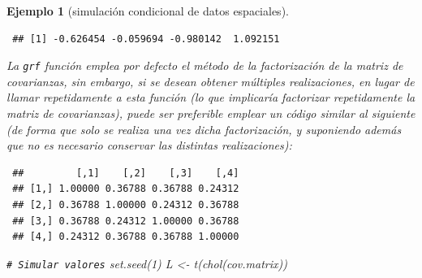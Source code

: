 \documentclass[
  10pt,
]{book}
\newenvironment{Shaded}{\begin{snugshade}}{\end{snugshade}}
\newcommand{\AttributeTok}[1]{\textcolor[rgb]{0.77,0.63,0.00}{#1}}
\newcommand{\CommentTok}[1]{\textcolor[rgb]{0.56,0.35,0.01}{\textit{#1}}}
\newcommand{\DecValTok}[1]{\textcolor[rgb]{0.00,0.00,0.81}{#1}}
\newcommand{\FunctionTok}[1]{\textcolor[rgb]{0.00,0.00,0.00}{#1}}
\newcommand{\NormalTok}[1]{#1}
\newcommand{\OtherTok}[1]{\textcolor[rgb]{0.56,0.35,0.01}{#1}}
\newcommand{\SpecialCharTok}[1]{\textcolor[rgb]{0.00,0.00,0.00}{#1}}
\theoremstyle{break}
\newtheorem{example}{Ejemplo}[chapter]
\theoremstyle{nonumberplain}
\renewcommand{\CommentTok}[1]{\textcolor[rgb]{0.41,0.41,0.41}{\texttt{#1}}}
\begin{document}
\begin{example}[simulación condicional de datos espaciales]
\begin{verbatim}
 ## [1] -0.626454 -0.059694 -0.980142  1.092151
\end{verbatim}

La \texttt{grf} función emplea por defecto el método de la factorización de la matriz de covarianzas,
sin embargo, si se desean obtener múltiples realizaciones, en lugar de llamar repetidamente a esta función (lo que implicaría factorizar repetidamente la matriz de covarianzas),
puede ser preferible emplear un código similar al siguiente (de forma que solo se realiza una vez dicha factorización, y suponiendo además que no es necesario conservar las distintas realizaciones):

\begin{Shaded}
\end{Shaded}

\begin{verbatim}
 ##         [,1]    [,2]    [,3]    [,4]
 ## [1,] 1.00000 0.36788 0.36788 0.24312
 ## [2,] 0.36788 1.00000 0.24312 0.36788
 ## [3,] 0.36788 0.24312 1.00000 0.36788
 ## [4,] 0.24312 0.36788 0.36788 1.00000
\end{verbatim}

\begin{Shaded}
\begin{Highlighting}[]
\CommentTok{\# Simular valores}
\FunctionTok{set.seed}\NormalTok{(}\DecValTok{1}\NormalTok{)}
\NormalTok{L }\OtherTok{\textless{}{-}} \FunctionTok{t}\NormalTok{(}\FunctionTok{chol}\NormalTok{(cov.matrix))}


\end{Highlighting}
\end{Shaded}
\end{example}
\end{document}
